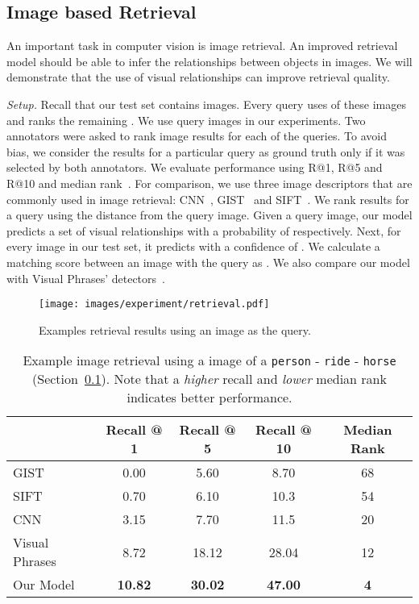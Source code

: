 \documentclass[runningheads]{llncs}
\newcommand{\relationship}[3]{\texttt{#1} - \texttt{#2} - \texttt{#3}}
\begin{document}
\subsection{Image based Retrieval}
\label{sec:ibr}

An important task in computer vision is image retrieval. An improved retrieval model should be able to infer the relationships between objects in images. We will demonstrate that the use of visual relationships can improve retrieval quality.

\textit{Setup.} Recall that our test set contains  images. Every query uses  of these  images and ranks the remaining . We use  query images in our experiments. Two annotators were asked to rank image results for each of the  queries.  To avoid bias, we consider the results for a particular query as ground truth only if it was selected by both annotators. We evaluate performance using R@1, R@5 and R@10 and median rank~\cite{Johnson2015Image}. For comparison, we use three image descriptors that are commonly used in image retrieval: CNN~\cite{simonyan2014very}, GIST~\cite{oliva2001modeling} and SIFT~\cite{lowe2004distinctive}. We rank results for a query using the  distance from the query image.
Given a query image, our model predicts a set of visual relationships  with a probability of  respectively. Next, for every image  in our test set, it predicts  with a confidence of . We calculate a matching score between an image with the query as . We also compare our model with Visual Phrases' detectors~\cite{sadeghi2011recognition}.


\begin{figure*}[t]
\centering
\setlength{\belowcaptionskip}{-15pt}
\texttt{[image: images/experiment/retrieval.pdf]}
\caption{Examples retrieval results using an image as the query. }
\label{fig:retrieval_results}
\end{figure*}

\begin{table}[t]
\centering
\small
\caption{Example image retrieval using a image of a \relationship{person}{ride}{horse} (Section~\ref{sec:ibr}). Note that a \textit{higher} recall and \textit{lower} median rank indicates better performance.}
\begin{tabular}{l c c c c}
     & Recall @ 1 & Recall @ 5 & Recall @ 10 & Median Rank\\
  \hline
  \hline
  GIST~\cite{oliva2001modeling} & 0.00 & 5.60 & 8.70 & 68\\
  SIFT~\cite{lowe2004distinctive} & 0.70 & 6.10 & 10.3 & 54\\
  CNN~\cite{simonyan2014very} & 3.15 & 7.70 & 11.5 & 20\\
Visual Phrases~\cite{sadeghi2011recognition} & 8.72 & 18.12 & 28.04 & 12 \\
  \hline
  \hline
  Our Model & \textbf{10.82} & \textbf{30.02} & \textbf{47.00} & \textbf{4}\\
\end{tabular}
\label{tab:image_retrieval}
\end{table}
\end{document}
